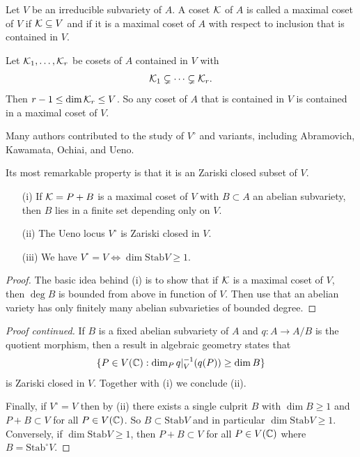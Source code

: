 \documentclass{beamer}
\begin{document}
\begin{frame}
  \begin{definition}
    Let $V$ be an irreducible subvariety of $A$. A coset ${\mathcal K}$ of $A$ is
    called a \alert{maximal coset} of $V$ if ${\mathcal K}\subseteq V$ and if it is
    a maximal coset of $A$ with respect to inclusion that is contained
    in $V$. 
  \end{definition}

  Let ${\mathcal K}_1,\ldots,{\mathcal K}_r$ be cosets of $A$ contained in $V$ with
  $${\mathcal K}_1\subsetneq \cdots\subsetneq {\mathcal K}_r.$$
  Then $r-1\le \dim {\mathcal K}_r\le V$. So
  any coset  of $A$ that is contained in $V$ is contained in a maximal
  coset of $V$.
\end{frame}

\begin{frame}
  Many authors contributed to the study of $V^{\circ}$ and variants, including
  Abramovich, Kawamata, Ochiai, and Ueno.

  Its most remarkable property is that it is an \alert{Zariski closed}
  subset of $V$. 
  
  \begin{theorem} 
    \begin{enumerate}
    \item [(i)] If ${\mathcal K}=P+B$ is a \alert{maximal} coset of $V$ with $B\subset
      A$ an abelian subvariety, then $B$ lies in a finite set
      depending only on $V$. 
    \item[(ii)] The Ueno locus $V^{\circ}$ is Zariski closed in $V$.
    \item[(iii)] We have $V^{\circ} = V\Longleftrightarrow
      \dim\mathrm{Stab} V\ge
      1$. 
    \end{enumerate}
  \end{theorem}
  \begin{proof}\renewcommand{\qedsymbol}{}
    The basic idea behind (i) is to show that if ${\mathcal K}$ is a maximal
    coset of $V$, then $\deg B$ is bounded from above in function of
    $V$. Then use that an abelian variety has only finitely many
    abelian subvarieties of bounded degree. 
  \end{proof}
\end{frame}

\begin{frame}
  \begin{proof}[Proof continued]
    If $B$ is a fixed abelian subvariety of $A$ and $q\colon
    A\rightarrow A/B$ is the quotient morphism, then
    a result in algebraic geometry states that
    \begin{equation*}
      \{P\in V({\mathbb{C}}) :    \dim_P q|_{V}^{-1}(q(P)) \ge \dim B\}    
    \end{equation*}
    is Zariski closed in $V$. Together with (i) we conclude (ii).

    Finally, if $V^{\circ}=V$ then by (ii) there exists a single culprit $B$ with
    $\dim B\ge 1$ and 
    $P+B\subset V$ for all $P\in V({\mathbb{C}})$. So $B\subset
    \mathrm{Stab} V$ and in particular $\dim \mathrm{Stab}V\ge 1$.
    Conversely, if $\dim \mathrm{Stab} V \ge 1$, then $P+B\subset V$
    for all $P\in V({\mathbb{C}})$ where $B=\mathrm{Stab}^{\circ} V$. 
  \end{proof}
\end{frame}
\end{document}
